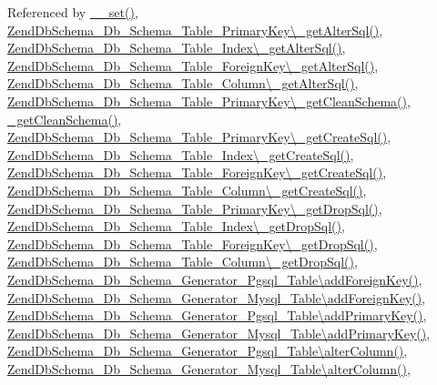 Referenced by \hyperlink{AbstractDefinition_8php_source_l00079}{\-\_\-\-\_\-set()}, \hyperlink{PrimaryKey_8php_source_l00030}{Zend\-Db\-Schema\-\_\-\-Db\-\_\-\-Schema\-\_\-\-Table\-\_\-\-Primary\-Key\textbackslash{}\-\_\-get\-Alter\-Sql()}, \hyperlink{Db_2Schema_2Table_2Index_8php_source_l00056}{Zend\-Db\-Schema\-\_\-\-Db\-\_\-\-Schema\-\_\-\-Table\-\_\-\-Index\textbackslash{}\-\_\-get\-Alter\-Sql()}, \hyperlink{ForeignKey_8php_source_l00058}{Zend\-Db\-Schema\-\_\-\-Db\-\_\-\-Schema\-\_\-\-Table\-\_\-\-Foreign\-Key\textbackslash{}\-\_\-get\-Alter\-Sql()}, \hyperlink{Db_2Schema_2Table_2Column_8php_source_l00065}{Zend\-Db\-Schema\-\_\-\-Db\-\_\-\-Schema\-\_\-\-Table\-\_\-\-Column\textbackslash{}\-\_\-get\-Alter\-Sql()}, \hyperlink{PrimaryKey_8php_source_l00065}{Zend\-Db\-Schema\-\_\-\-Db\-\_\-\-Schema\-\_\-\-Table\-\_\-\-Primary\-Key\textbackslash{}\-\_\-get\-Clean\-Schema()}, \hyperlink{AbstractDefinition_8php_source_l00097}{\-\_\-get\-Clean\-Schema()}, \hyperlink{PrimaryKey_8php_source_l00038}{Zend\-Db\-Schema\-\_\-\-Db\-\_\-\-Schema\-\_\-\-Table\-\_\-\-Primary\-Key\textbackslash{}\-\_\-get\-Create\-Sql()}, \hyperlink{Db_2Schema_2Table_2Index_8php_source_l00064}{Zend\-Db\-Schema\-\_\-\-Db\-\_\-\-Schema\-\_\-\-Table\-\_\-\-Index\textbackslash{}\-\_\-get\-Create\-Sql()}, \hyperlink{ForeignKey_8php_source_l00066}{Zend\-Db\-Schema\-\_\-\-Db\-\_\-\-Schema\-\_\-\-Table\-\_\-\-Foreign\-Key\textbackslash{}\-\_\-get\-Create\-Sql()}, \hyperlink{Db_2Schema_2Table_2Column_8php_source_l00073}{Zend\-Db\-Schema\-\_\-\-Db\-\_\-\-Schema\-\_\-\-Table\-\_\-\-Column\textbackslash{}\-\_\-get\-Create\-Sql()}, \hyperlink{PrimaryKey_8php_source_l00022}{Zend\-Db\-Schema\-\_\-\-Db\-\_\-\-Schema\-\_\-\-Table\-\_\-\-Primary\-Key\textbackslash{}\-\_\-get\-Drop\-Sql()}, \hyperlink{Db_2Schema_2Table_2Index_8php_source_l00048}{Zend\-Db\-Schema\-\_\-\-Db\-\_\-\-Schema\-\_\-\-Table\-\_\-\-Index\textbackslash{}\-\_\-get\-Drop\-Sql()}, \hyperlink{ForeignKey_8php_source_l00050}{Zend\-Db\-Schema\-\_\-\-Db\-\_\-\-Schema\-\_\-\-Table\-\_\-\-Foreign\-Key\textbackslash{}\-\_\-get\-Drop\-Sql()}, \hyperlink{Db_2Schema_2Table_2Column_8php_source_l00057}{Zend\-Db\-Schema\-\_\-\-Db\-\_\-\-Schema\-\_\-\-Table\-\_\-\-Column\textbackslash{}\-\_\-get\-Drop\-Sql()}, \hyperlink{Generator_2Pgsql_2Table_8php_source_l00301}{Zend\-Db\-Schema\-\_\-\-Db\-\_\-\-Schema\-\_\-\-Generator\-\_\-\-Pgsql\-\_\-\-Table\textbackslash{}add\-Foreign\-Key()}, \hyperlink{Generator_2Mysql_2Table_8php_source_l00324}{Zend\-Db\-Schema\-\_\-\-Db\-\_\-\-Schema\-\_\-\-Generator\-\_\-\-Mysql\-\_\-\-Table\textbackslash{}add\-Foreign\-Key()}, \hyperlink{Generator_2Pgsql_2Table_8php_source_l00271}{Zend\-Db\-Schema\-\_\-\-Db\-\_\-\-Schema\-\_\-\-Generator\-\_\-\-Pgsql\-\_\-\-Table\textbackslash{}add\-Primary\-Key()}, \hyperlink{Generator_2Mysql_2Table_8php_source_l00279}{Zend\-Db\-Schema\-\_\-\-Db\-\_\-\-Schema\-\_\-\-Generator\-\_\-\-Mysql\-\_\-\-Table\textbackslash{}add\-Primary\-Key()}, \hyperlink{Generator_2Pgsql_2Table_8php_source_l00174}{Zend\-Db\-Schema\-\_\-\-Db\-\_\-\-Schema\-\_\-\-Generator\-\_\-\-Pgsql\-\_\-\-Table\textbackslash{}alter\-Column()}, \hyperlink{Generator_2Mysql_2Table_8php_source_l00182}{Zend\-Db\-Schema\-\_\-\-Db\-\_\-\-Schema\-\_\-\-Generator\-\_\-\-Mysql\-\_\-\-Table\textbackslash{}alter\-Column()}, 